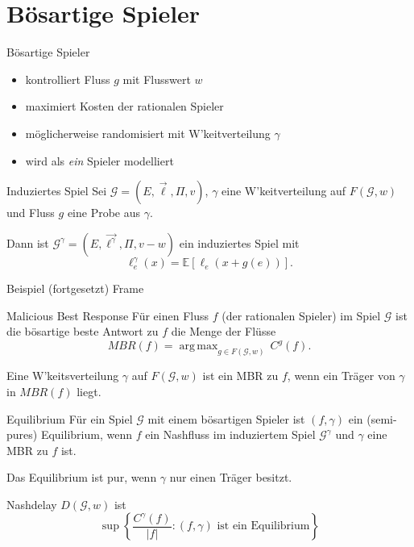 \documentclass{beamer}
\DeclareMathOperator*{\argmax}{arg\,max}
\begin{document}
\section{Bösartige Spieler}
\begin{frame}{Bösartige Spieler}
	\begin{itemize}
		\item kontrolliert Fluss $g$ mit Flusswert $w$
		\item maximiert Kosten der rationalen Spieler
		\item möglicherweise randomisiert mit W'keitverteilung $\gamma$
		\item wird als \emph{ein} Spieler modelliert
	\end{itemize}
\end{frame}

\begin{frame}{Induziertes Spiel}
	Sei $\mathcal G = (E, \vec{\ell}, \Pi, v)$, $\gamma$ eine W'keitverteilung auf $F(\mathcal G, w)$ und Fluss $g$ eine Probe aus $\gamma$. 
	
	Dann ist $\mathcal G^\gamma = (E, \vec{\ell^\gamma}, \Pi, v-w)$ ein \alert{induziertes Spiel} mit 
	\[ \ell_e^\gamma(x) = \mathbb E[\ell_e(x+ g(e))] .\]
\end{frame}

\begin{frame}{Beispiel (fortgesetzt)}
	Frame
\end{frame}

\begin{frame}{Malicious Best Response}
	Für einen Fluss $f$ (der rationalen Spieler) im Spiel $\mathcal G$ ist die \alert{bösartige beste Antwort} zu $f$ die Menge der Flüsse
	\[ MBR(f) = \argmax_{g \in F(\mathcal G, w)} \, C^g(f) .\]
	
	Eine W'keitsverteilung $\gamma$ auf $F(\mathcal G, w)$ ist ein MBR zu $f$, wenn ein Träger von $\gamma$ in $MBR(f)$ liegt.
\end{frame}

\begin{frame}{Equilibrium}
	Für ein Spiel $\mathcal G$ mit einem bösartigen Spieler ist $(f, \gamma)$ ein (semi-pures) \alert{Equilibrium}, wenn $f$ ein Nashfluss im induziertem Spiel $\mathcal G^\gamma$ und $\gamma$ eine MBR zu $f$ ist. 
	
	Das Equilibrium ist \alert{pur}, wenn $\gamma$ nur einen Träger besitzt.
	
	Nashdelay $D(\mathcal G, w)$ ist
	\[
		\sup \left\{\frac{C^\gamma(f)}{|f|} : (f,\gamma) \text{ ist ein Equilibrium} \right\}
	\]
\end{frame}
\end{document}
